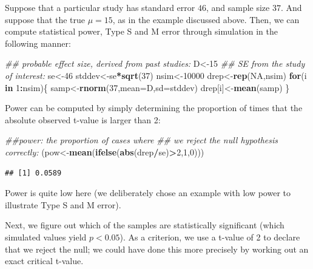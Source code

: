\documentclass[12pt,]{krantz}
\newenvironment{Shaded}{\begin{snugshade}}{\end{snugshade}}
\newcommand{\CommentTok}[1]{\textcolor[rgb]{0.56,0.35,0.01}{\textit{#1}}}
\newcommand{\ControlFlowTok}[1]{\textcolor[rgb]{0.13,0.29,0.53}{\textbf{#1}}}
\newcommand{\DataTypeTok}[1]{\textcolor[rgb]{0.13,0.29,0.53}{#1}}
\newcommand{\DecValTok}[1]{\textcolor[rgb]{0.00,0.00,0.81}{#1}}
\newcommand{\KeywordTok}[1]{\textcolor[rgb]{0.13,0.29,0.53}{\textbf{#1}}}
\newcommand{\NormalTok}[1]{#1}
\newcommand{\OperatorTok}[1]{\textcolor[rgb]{0.81,0.36,0.00}{\textbf{#1}}}
\newcommand{\OtherTok}[1]{\textcolor[rgb]{0.56,0.35,0.01}{#1}}
\begin{document}
Suppose that a particular study has standard error \(46\), and sample size \(37\). And suppose that the true \(\mu=15\), as in the example discussed above. Then, we can compute statistical power, Type S and M error through simulation in the following manner:

\begin{Shaded}
\begin{Highlighting}[]
\CommentTok{## probable effect size, derived from past studies:}
\NormalTok{D<-}\DecValTok{15}
\CommentTok{## SE from the study of interest:}
\NormalTok{se<-}\DecValTok{46}
\NormalTok{stddev<-se}\OperatorTok{*}\KeywordTok{sqrt}\NormalTok{(}\DecValTok{37}\NormalTok{)}
\NormalTok{nsim<-}\DecValTok{10000}
\NormalTok{drep<-}\KeywordTok{rep}\NormalTok{(}\OtherTok{NA}\NormalTok{,nsim)}
\ControlFlowTok{for}\NormalTok{(i }\ControlFlowTok{in} \DecValTok{1}\OperatorTok{:}\NormalTok{nsim)\{}
\NormalTok{samp<-}\KeywordTok{rnorm}\NormalTok{(}\DecValTok{37}\NormalTok{,}\DataTypeTok{mean=}\NormalTok{D,}\DataTypeTok{sd=}\NormalTok{stddev)}
\NormalTok{drep[i]<-}\KeywordTok{mean}\NormalTok{(samp)}
\NormalTok{\}}
\end{Highlighting}
\end{Shaded}

Power can be computed by simply determining the proportion of times that the absolute observed t-value is larger than 2:

\begin{Shaded}
\begin{Highlighting}[]
\CommentTok{##power: the proportion of cases where }
\CommentTok{## we reject the null hypothesis correctly:}
\NormalTok{(pow<-}\KeywordTok{mean}\NormalTok{(}\KeywordTok{ifelse}\NormalTok{(}\KeywordTok{abs}\NormalTok{(drep}\OperatorTok{/}\NormalTok{se)}\OperatorTok{>}\DecValTok{2}\NormalTok{,}\DecValTok{1}\NormalTok{,}\DecValTok{0}\NormalTok{)))}
\end{Highlighting}
\end{Shaded}

\begin{verbatim}
## [1] 0.0589
\end{verbatim}

Power is quite low here (we deliberately chose an example with low power to illustrate Type S and M error).

Next, we figure out which of the samples are statistically significant (which simulated values yield \(p<0.05\)). As a criterion, we use a t-value of 2 to declare that we reject the null; we could have done this more precisely by working out an exact critical t-value.
\end{document}
